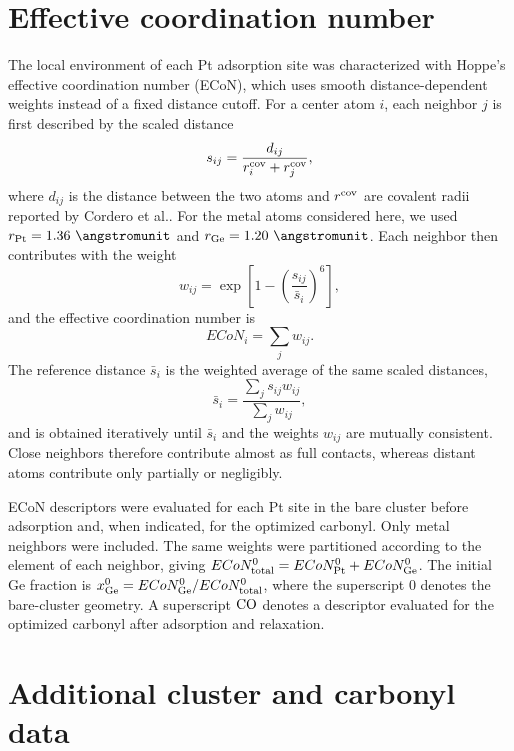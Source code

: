 \section*{Effective coordination number}
\label{sec:supporting_econ_definition}

The local environment of each Pt adsorption site was characterized with
Hoppe's effective coordination number (ECoN),\cite{hoppe:econ:1979} which
uses smooth distance-dependent weights instead of a fixed distance cutoff.
For a center atom \(i\), each neighbor \(j\) is first described by the scaled
distance
\begin{equation}
s_{ij}=\frac{d_{ij}}{r_i^{\rm cov}+r_j^{\rm cov}},
\end{equation}
where \(d_{ij}\) is the distance between the two atoms and \(r^{\rm cov}\) are
covalent radii reported by Cordero et al.\cite{cordero:covalent-radii:2008}.
For the metal atoms considered here, we used
\(r_{\ce{Pt}}=1.36~\si{\angstromunit}\) and
\(r_{\ce{Ge}}=1.20~\si{\angstromunit}\). Each neighbor then contributes with
the weight
\begin{equation}
w_{ij}=\exp\left[1-\left(\frac{s_{ij}}{\bar{s}_i}\right)^6\right],
\end{equation}
and the effective coordination number is
\begin{equation}
ECoN_i=\sum_j w_{ij}.
\end{equation}
The reference distance \(\bar{s}_i\) is the weighted average of the same
scaled distances,
\begin{equation}
\bar{s}_i=\frac{\sum_j s_{ij}w_{ij}}{\sum_j w_{ij}},
\end{equation}
and is obtained iteratively until \(\bar{s}_i\) and the weights \(w_{ij}\)
are mutually consistent. Close neighbors therefore contribute almost as full
contacts, whereas distant atoms contribute only partially or negligibly.

ECoN descriptors were evaluated for each Pt site in the bare cluster before
 adsorption and, when indicated, for the optimized carbonyl. Only
metal neighbors were included. The same weights were partitioned according to
the element of each neighbor, giving
\(ECoN_{\rm total}^{0}=ECoN_{\rm Pt}^{0}+ECoN_{\rm Ge}^{0}\). The initial Ge
fraction is \(x_{\rm Ge}^{0}=ECoN_{\rm Ge}^{0}/ECoN_{\rm total}^{0}\), where
the superscript 0 denotes the bare-cluster geometry. A superscript \(\ce{CO}\)
denotes a descriptor evaluated for the optimized carbonyl after adsorption and
relaxation.
\newpage
\section*{Additional cluster and carbonyl data}

